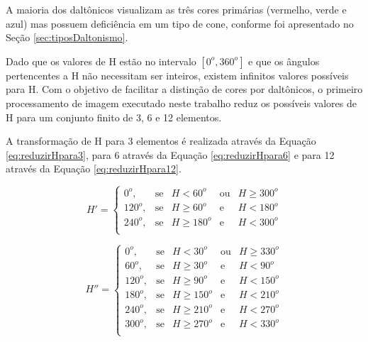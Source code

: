\documentclass[	12pt, Times, openright, twoside, a4paper, english, brazil]{abntex2}
\begin{document}
A maioria dos daltônicos visualizam as três cores primárias (vermelho, verde e azul) mas possuem deficiência em um tipo de cone, conforme foi apresentado no Seção \ref{sec:tiposDaltonismo}. 

Dado que os valores de H estão no intervalo $[0^o, 360^o]$ e que os ângulos pertencentes a H não necessitam ser inteiros, existem infinitos valores possíveis para H. Com o objetivo de facilitar a distinção de cores por daltônicos, o primeiro processamento de imagem executado neste trabalho reduz os possíveis valores de H para um conjunto finito de 3, 6 e 12 elementos.

A transformação de H para 3 elementos é realizada através da Equação \ref{eq:reduzirHpara3}, para 6 através da Equação \ref{eq:reduzirHpara6} e para 12 através da Equação \ref{eq:reduzirHpara12}. 

\begin{equation}
\label{eq:reduzirHpara3}
H'=\left\{
\begin{array}{rclcl}
    0^o,    &\mbox{se}  & H <60^o       & \mbox{ou} & H \geq 300^o  \\
    120^o,  &\mbox{se}  & H \geq 60^o   & \mbox{e}  & H < 180^o     \\
    240^o,  &\mbox{se}  & H \geq 180^o  & \mbox{e}  & H < 300^o     \\
\end{array}\right.
\end{equation}

\begin{equation}
\label{eq:reduzirHpara6}
H''=\left\{
\begin{array}{rclcl}
    0^o,    &\mbox{se}  & H <30^o       & \mbox{ou} & H \geq 330^o  \\
    60^o,   &\mbox{se}  & H \geq 30^o   & \mbox{e}  & H < 90^o      \\
    120^o,  &\mbox{se}  & H \geq 90^o   & \mbox{e}  & H < 150^o     \\
    180^o,  &\mbox{se}  & H \geq 150^o  & \mbox{e}  & H < 210^o     \\
    240^o,  &\mbox{se}  & H \geq 210^o  & \mbox{e}  & H < 270^o     \\
    300^o,  &\mbox{se}  & H \geq 270^o  & \mbox{e}  & H < 330^o     \\
\end{array}\right.
\end{equation}
\end{document}
